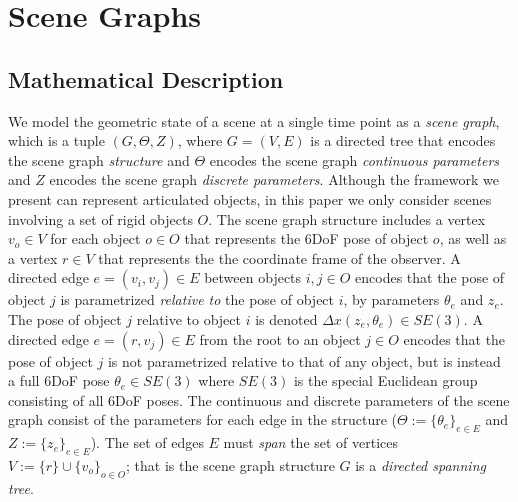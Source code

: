 \chapter{Scene Graphs}

\section{Mathematical Description}
We model the geometric state of a scene at a single time point as a \emph{scene graph}, which is a tuple $(G, \Theta, Z)$, where $G = (V, E)$ is a directed tree that encodes the scene graph \emph{structure} and $\Theta$ encodes the scene graph \emph{continuous parameters} and $Z$ encodes the scene graph \emph{discrete parameters}.
Although the framework we present can represent articulated objects, in this paper we only consider scenes involving a set of rigid objects $O$.
The scene graph structure includes a vertex $v_o \in V$ for each object $o \in O$ that represents the 6DoF pose of object $o$, as well as a vertex $r \in V$ that represents the the coordinate frame of the observer.
A directed edge $e = (v_i, v_j) \in E$ between objects $i, j \in O$ encodes that the pose of object $j$ is parametrized \emph{relative to} the pose of object $i$, by parameters $\theta_e$ and $z_e$.
The pose of object $j$ relative to object $i$ is denoted $\Delta x(z_e, \theta_e) \in SE(3)$.
A directed edge $e = (r, v_j) \in E$ from the root to an object $j \in O$ encodes that the pose of object $j$ is not parametrized relative to that of any object, but is instead a full 6DoF pose $\theta_e \in SE(3)$ where $SE(3)$ is the special Euclidean group consisting of all 6DoF poses.
The continuous and discrete parameters of the scene graph consist of the parameters for each edge in the structure ($\Theta := \{\theta_e\}_{e \in E}$ and $Z := \{z_e\}_{e \in E}$).
The set of edges $E$ must \emph{span} the set of vertices $V := \{r\} \cup \{v_o\}_{o \in O}$; that is the scene graph structure $G$ is a \emph{directed spanning tree}.

